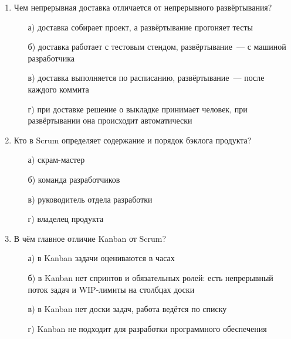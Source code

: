 \begin{enumerate}
\item Чем непрерывная доставка отличается от непрерывного развёртывания?
  \begin{enumerate}
    \item[а)] доставка собирает проект, а развёртывание прогоняет тесты
    \item[б)] доставка работает с тестовым стендом, развёртывание~--- с машиной
      разработчика
    \item[в)] доставка выполняется по расписанию, развёртывание~--- после
      каждого коммита
    \item[г)] при доставке решение о выкладке принимает человек, при
      развёртывании она происходит автоматически
  \end{enumerate}

\item Кто в Scrum определяет содержание и порядок бэклога продукта?
  \begin{enumerate}
    \item[а)] скрам-мастер
    \item[б)] команда разработчиков
    \item[в)] руководитель отдела разработки
    \item[г)] владелец продукта
  \end{enumerate}

\item В чём главное отличие Kanban от Scrum?
  \begin{enumerate}
    \item[а)] в Kanban задачи оцениваются в часах
    \item[б)] в Kanban нет спринтов и обязательных ролей: есть непрерывный
      поток задач и WIP-лимиты на столбцах доски
    \item[в)] в Kanban нет доски задач, работа ведётся по списку
    \item[г)] Kanban не подходит для разработки программного обеспечения
  \end{enumerate}

\end{enumerate}
